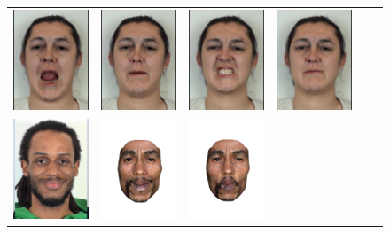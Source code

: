 \begin{figure}
\begin{tabular}{cccccc}
\includegraphics[width=.1535\textwidth]{figures/results/kat_on_zimo/composite000209.jpg}&
\includegraphics[width=.1535\textwidth]{figures/results/kat_on_zimo/composite000284.jpg}&
\includegraphics[width=.1535\textwidth]{figures/results/kat_on_zimo/composite000311.jpg}&
\includegraphics[width=.1535\textwidth]{figures/results/kat_on_zimo/composite000336.jpg}\\
\includegraphics[width=.1535\textwidth]{figures/results/marley_on_tidus_new/000024.jpg}&
\includegraphics[width=.1535\textwidth]{figures/results/marley_on_tidus_new/light000002.png}&
\includegraphics[width=.1535\textwidth]{figures/results/marley_on_tidus_new/light000005.png}&

\end{tabular}
\end{figure}
